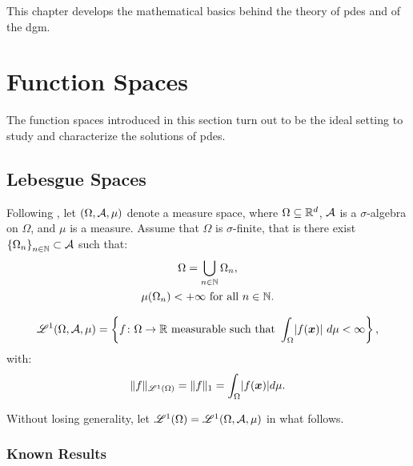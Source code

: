 This chapter develops the mathematical basics behind the theory of \acrlong{pdes} and of the \acrlong{dgm}.

\section{Function Spaces}

The function spaces introduced in this section turn out to be the ideal setting to study and characterize the solutions of \acrshort{pdes}.

\subsection{Lebesgue Spaces}

Following \cite[p. 89]{Brezis2010}, let $(\Omega, \mathcal{A}, \mu)$ denote a measure space, where $\Omega \subseteq \mathbb{R}^d$, $\mathcal{A}$ is a $\sigma$-algebra on $\Omega$, and $\mu$ is a measure. Assume that $\Omega$ is $\sigma$-finite, that is there exist $\left\{ \Omega_n \right\}_{n \in \mathbb{N}} \subset \mathcal{A}$ such that:
\begin{gather}
    \Omega = \bigcup_{n \in \mathbb{N}} \Omega_n, \\
    \mu(\Omega_n) < +\infty \text{ for all } n \in \mathbb{N}.
\end{gather}

\begin{definition}[$\Lp{1}(\Omega, \MA, \mu)$]
    \begin{gather}
        \mathscr{L}^{1}(\Omega, \mathcal{A}, \mu) = \left\{ f \colon \Omega \rightarrow \mathbb{R} \text{ measurable such that } \int_{\Omega} \lvert f(\bm{x}) \rvert ~ d \mu < \infty \right\},
    \end{gather}
    with:
    \begin{gather}
    \lVert f \rVert_{\mathscr{L}^{1}(\Omega)} = \lVert f \rVert_{1} = \int_{\Omega} \lvert f(\bm{x}) \rvert d \mu.
    \end{gather}
\end{definition}

Without losing generality, let $\mathscr{L}^{1}(\Omega) = \mathscr{L}^{1}(\Omega, \mathcal{A}, \mu)$ in what follows.

\subsubsection{Known Results}

